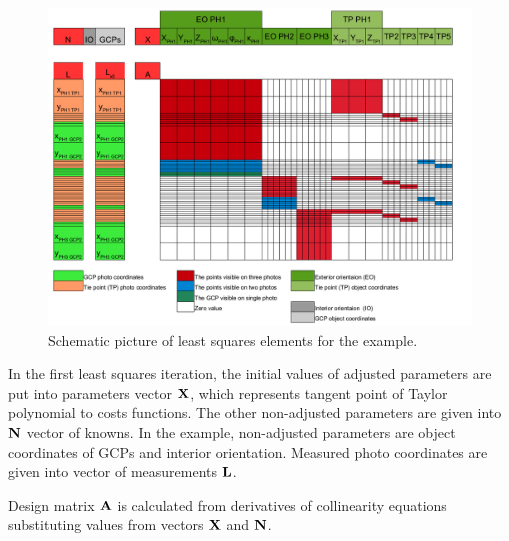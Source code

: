 \documentclass[a4paper,12pt]{article}
\newcommand{\evect}[1]{
{\bf #1}
}
\begin{document}
\begin{figure}[h]
    \hspace*{-1.0in}
   \includegraphics[scale=0.47]{figures/bba_system.png}
    \caption{Schematic picture of least squares elements for the example.}
    \label{fig:bba_system}
\end{figure}



In the first least squares iteration, the initial values of adjusted parameters are put into parameters vector $\evect{X}$,
which represents tangent point of Taylor polynomial to costs functions.  The other non-adjusted 
parameters are given into $\evect{N}$ vector of knowns. In the example, non-adjusted parameters are object coordinates
of GCPs and interior orientation. 
Measured photo coordinates are given
into vector of measurements $\evect{L}$.

Design matrix $\evect{A}$ is calculated from 
derivatives of collinearity equations substituting values from vectors $\evect{X}$ and $\evect{N}$.
\end{document}
